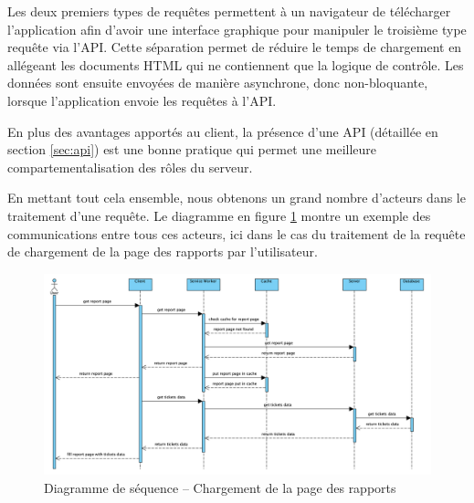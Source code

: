 \documentclass{EPL-master-thesis-covers-FR}
\begin{document}
				Les deux premiers types de requêtes permettent à un navigateur de télécharger l'application afin d'avoir une interface graphique pour manipuler le troisième type requête via l'API. Cette séparation permet de réduire le temps de chargement en allégeant les documents HTML qui ne contiennent que la logique de contrôle. Les données sont ensuite envoyées de manière asynchrone, donc non-bloquante, lorsque l'application envoie les requêtes à l'API.

				En plus des avantages apportés au client, la présence d'une API (détaillée en section \ref{sec:api}) est une bonne pratique qui permet une meilleure compartementalisation des rôles du serveur.

				En mettant tout cela ensemble, nous obtenons un grand nombre d'acteurs dans le traitement d'une requête. Le diagramme en figure \ref{fig:sequence} montre un exemple des communications entre tous ces acteurs, ici dans le cas du traitement de la requête de chargement de la page des rapports par l'utilisateur.

				\begin{figure}
					\includegraphics[width=\textwidth]{images/sequence}
					\caption{Diagramme de séquence -- Chargement de la page des rapports}
					\label{fig:sequence}
				\end{figure}


\end{document}

